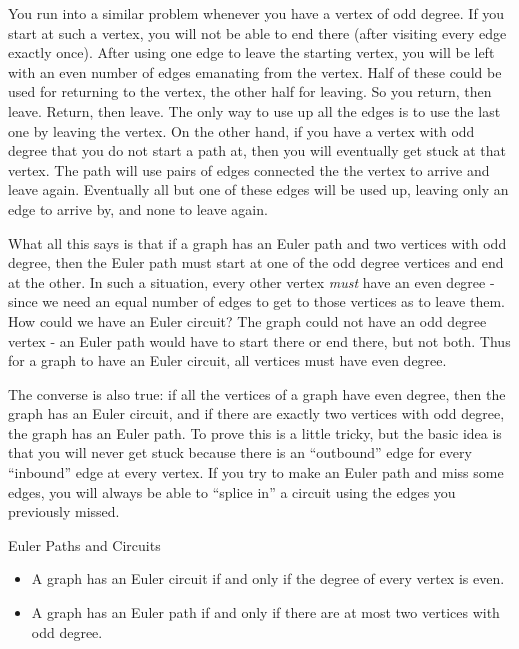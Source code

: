 \documentclass[12pt]{article}
\begin{document}
You run into a similar problem whenever you have a vertex of odd degree.  If you start at such a vertex, you will not be able to end there (after visiting every edge exactly once).  After using one edge to leave the starting vertex, you will be left with an even number of edges emanating from the vertex.  Half of these could be used for returning to the vertex, the other half for leaving.  So you return, then leave.  Return, then leave.  The only way to use up all the edges is to use the last one by leaving the vertex.  On the other hand, if you have a vertex with odd degree that you do not start a path at, then you will eventually get stuck at that vertex.  The path will use pairs of edges connected the the vertex to arrive and leave again.  Eventually all but one of these edges will be used up, leaving only an edge to arrive by, and none to leave again.

What all this says is that if a graph has an Euler path and two vertices with odd degree, then the Euler path must start at one of the odd degree vertices and end at the other.  In such a situation, every other vertex {\em must} have an even degree - since we need an equal number of edges to get to those vertices as to leave them.  How could we have an Euler circuit?  The graph could not have an odd degree vertex - an Euler path would have to start there or end there, but not both.  Thus for a graph to have an Euler circuit, all vertices must have even degree.  

The converse is also true: if all the vertices of a graph have even degree, then the graph has an Euler circuit, and if there are exactly two vertices with odd degree, the graph has an Euler path.  To prove this is a little tricky, but the basic idea is that you will never get stuck because there is an ``outbound'' edge for every ``inbound'' edge at every vertex.  If you try to make an Euler path and miss some edges, you will always be able to ``splice in'' a circuit using the edges you previously missed.

\begin{defbox}{Euler Paths and Circuits}
\begin{itemize}
 \item A graph has an Euler circuit if and only if the degree of every vertex is even.
 \item A graph has an Euler path if and only if there are at most two vertices with odd degree.
\end{itemize}

\end{defbox}
\end{document}
